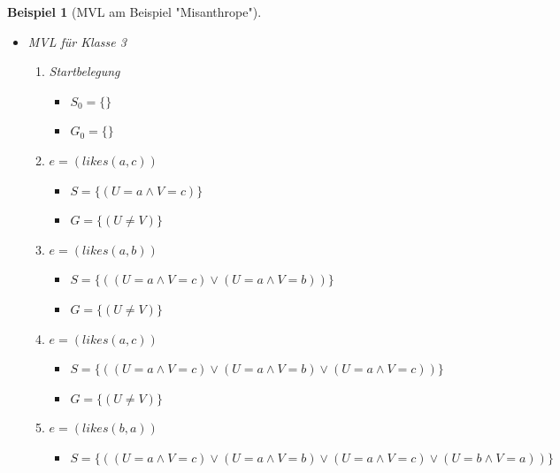 \documentclass[draft]{scrreprt}
\newtheorem{Bsp}{Beispiel}[section]
\begin{document}
\begin{Bsp}[MVL am Beispiel "{}Misanthrope"{}]
\begin{itemize}
\begin{enumerate}
\begin{itemize}
			\item $ G_0 = \{(U \neq V)\} $
		\end{itemize}
		\item $ e = (likes(c,b)) $
		\begin{itemize}
			\item $ S = \{(U = c \land V = b)\}$ 
			\item $ G = \{(U \neq V)\} $
		\end{itemize}
		\item $ e = (likes(b,c)) $
		\begin{itemize}
			\item \item $ S = \{()(U = c \land V = b) \lor (U = b \land V = c))\}$ 
			\item $ G = \{(U \neq V)\} $
		\end{itemize}
		\end{enumerate}
	\item MVL für Klasse 3
	\begin{enumerate}
		\item Startbelegung
		\begin{itemize}
			\item $ S_0 = \{\}$ 
			\item $ G_0 = \{\} $
		\end{itemize}
		\item $ e = (likes(a,c)) $
		\begin{itemize}
			\item $ S = \{(U = a \land V = c)\}$ 
			\item $ G = \{(U \neq V)\} $
		\end{itemize}
		\item $ e = (likes(a,b)) $
		\begin{itemize}
			\item $ S = \{((U = a \land V = c) \lor (U = a \land V = b))\}$ 
			\item $ G = \{(U \neq V)\} $
		\end{itemize}
		\item $ e = (likes(a,c)) $
		\begin{itemize}
			\item $ S = \{((U = a \land V = c) \lor (U = a \land V = b) \lor (U = a \land V = c))\}$ 
			\item $ G = \{(U \neq V)\} $
		\end{itemize}	
		\item $ e = (likes(b,a)) $
		\begin{itemize}
			\item $ S = \{((U = a \land V = c) \lor (U = a \land V = b) \lor (U = a \land V = c) \lor (U = b \land V = a))\}$ 

\end{itemize}
\end{enumerate}
\end{itemize}
\end{Bsp}
\end{document}
